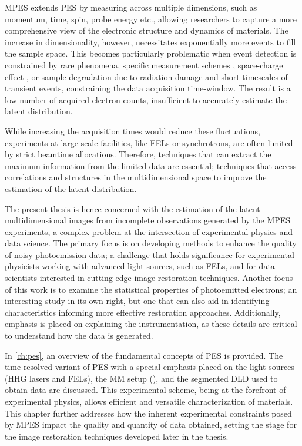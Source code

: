 \Gls{MPES} extends \gls{PES} by measuring across multiple dimensions, such as momentum, time, spin, probe energy etc., allowing researchers to capture a more comprehensive view of the electronic structure and dynamics of materials. The increase in dimensionality, however, necessitates exponentially more events to fill the sample space. This becomes particularly problematic when event detection is constrained by rare phenomena, specific measurement schemes \cite{maklarQuantitativeComparisonTimeflight2020}, space-charge effect \cite{schonhenseMultidimensionalPhotoemissionSpectroscopy2018}, or sample degradation due to radiation damage and short timescales of transient events, constraining the data acquisition time-window. The result is a low number of acquired electron counts, insufficient to accurately estimate the \gls{latent} distribution. 

While increasing the acquisition times would reduce these fluctuations, experiments at large-scale facilities, like \glspl{FEL} or synchrotrons, are often limited by strict \gls{beamtime} allocations. Therefore, techniques that can extract the maximum information from the limited data are essential; techniques that access correlations and structures in the multidimensional space to improve the estimation of the latent distribution.

The present thesis is hence concerned with the estimation of the latent multidimensional images from incomplete observations generated by the \gls{MPES} experiments, a complex problem at the intersection of experimental physics and data science. The primary focus is on developing methods to enhance the quality of noisy photoemission data; a challenge that holds significance for experimental physicists working with advanced light sources, such as \glspl{FEL}, and for data scientists interested in cutting-edge image restoration techniques. Another focus of this work is to examine the statistical properties of photoemitted electrons; an interesting study in its own right, but one that can also aid in identifying characteristics informing more effective restoration approaches. Additionally, emphasis is placed on explaining the instrumentation, as these details are critical to understand how the data is generated.

In \cref{ch:pes}, an overview of the fundamental concepts of \gls{PES} is provided. The time-resolved variant of \gls{PES} with a special emphasis placed on the light sources (HHG lasers and \glspl{FEL}), the \gls{MM} setup (), and the segmented \gls{DLD} used to obtain data are discussed. This experimental scheme, being at the forefront of experimental physics, allows efficient and versatile characterization of materials. This chapter further addresses how the inherent experimental constraints posed by \gls{MPES} impact the quality and quantity of data obtained, setting the stage for the image restoration techniques developed later in the thesis.

